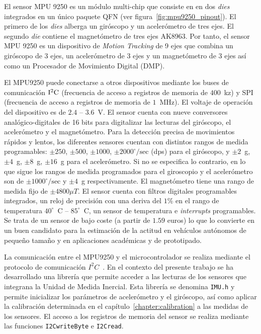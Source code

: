\documentclass[a4paper,12pt]{book}
\begin{document}
El sensor MPU 9250 \cite{mpu9250datasheet} es un módulo multi-chip que consiste en en dos \emph{dies} integrados en un único paquete QFN (ver figura~\ref{fig:mpu9250_pinout}). El primero de los \emph{dies} alberga un giróscopo y un acelerómetro de tres ejes. El segundo \emph{die} contiene el magnetómetro de tres ejes AK8963. Por tanto, el sensor MPU 9250 es un dispositivo de \emph{Motion Tracking} de 9 ejes que combina un giróscopo de 3 ejes, un acelerómetro de 3 ejes y un magnetómetro de 3 ejes así como un Procesador de Movimiento Digital (DMP).  

El MPU9250 puede conectarse a otros dispositivos mediante los buses de comunicación $\rm{I^2C}$ (frecuencia de acceso a registros de memoria de $400$~kz) y SPI (frecuencia de acceso a registros de memoria de $1$~MHz). El voltaje de operación del dispositivo es de $2.4$ -- $3.6$~V. El sensor cuenta con nueve conversores analógico-digitales de 16 bits para digitalizar las lecturas del giróscopo, el acelerómetro y el magnetómetro. Para la detección precisa de movimientos rápidos y lentos, los diferentes sensores cuentan con distintos rangos de medida programables: $\pm 250$, $\pm 500$, $\pm 1000$, $\pm 2000^\circ/\mathrm{sec}$ (dps) para el giróscopo, y  $\pm 2$~g, $\pm 4$~g, $\pm 8$~g, $\pm 16$~g para el acelerómetro. Si no se especifica lo contrario, en lo que sigue los rangos de medida programados para el giroscopio y el acelerómetro son de $\pm1000^\circ/\mathrm{sec}$ y $\pm4$~g respectivamente. El magnetómetro tiene una rango de medida fijo de $\pm4800 \mu T$. El sensor cuenta con filtros digitales programables integrados, un reloj de precisión con una deriva del $1\%$ en el rango de temperatura $40^\circ$~C -- $85^\circ$~C, un sensor de temperatura e \emph{interrupts} programables. Se trata de un sensor de bajo coste (a partir de $1.59$ euros) lo que lo convierte en un buen candidato para la estimación de la actitud en vehículos autónomos de pequeño tamaño y en aplicaciones académicas y de prototipado.

La comunicación entre el MPU9250 y el microcontrolador se realiza mediante el protocolo de comunicación $I^2C$~\cite{paret1997i2c}. En el contexto del presente trabajo se ha desarrollado una librería que permite acceder a las lecturas de los sensores que integrana la Unidad de Medida Inercial. Esta librería se denomina \texttt{IMU.h} y permite inicializar los parámetros de acelerómetro y el giróscopo, así como aplicar la calibración determinada en el capítulo~\ref{chapter:calibration} a las medidas de los sensores. El acceso a los registros de memoria del sensor se realiza mediante las funciones \texttt{I2CwriteByte} e \texttt{I2Cread}.
\end{document}
